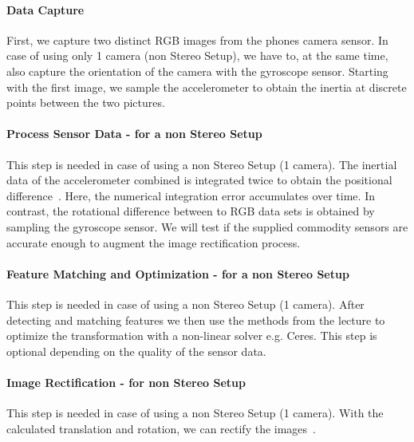 \documentclass[a4paper,pagesize 10pt]{scrartcl}
\begin{document}

\paragraph{Data Capture}
First, we capture two distinct RGB images from the phones camera sensor.
In case of using only 1 camera (non Stereo Setup), we have to, at the same time, also capture the orientation of the camera with the gyroscope sensor.
Starting with the first image, we sample the accelerometer to obtain the inertia at discrete points between the two pictures.
\paragraph{Process Sensor Data - for a non Stereo Setup}
This step is needed in case of using a non Stereo Setup (1 camera).
The inertial data of the accelerometer combined is integrated twice to obtain the positional difference~\cite{Seifert2007,Kok2017}.
Here, the numerical integration error accumulates over time. In contrast, the rotational difference between to RGB data sets is obtained by sampling the gyroscope sensor.
We will test if the supplied commodity sensors are accurate enough to augment the image rectification process.
\paragraph{Feature Matching and Optimization - for a non Stereo Setup}
This step is needed in case of using a non Stereo Setup (1 camera).
After detecting and matching features we then use the methods from the lecture to optimize the transformation with a non-linear solver e.g. Ceres.
This step is optional depending on the quality of the sensor data.
\paragraph{Image Rectification - for non Stereo Setup}
This step is needed in case of using a non Stereo Setup (1 camera).
With the calculated translation and rotation, we can rectify the images~\cite{loop1999, Fusiello2000}. 
\end{document}
